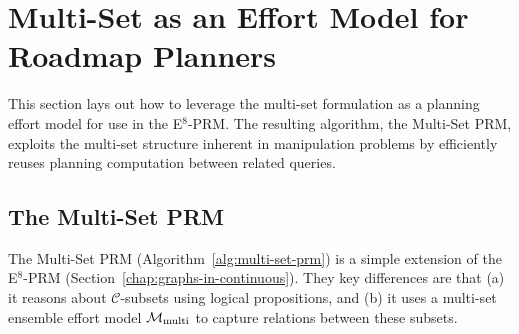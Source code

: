 %
%
%
%
%
%
%
%
%
%
%
%


\clearpage
\section{Multi-Set as an Effort Model for Roadmap Planners}
\label{chap:multi-set-prm}

This section lays out how to leverage the multi-set formulation
as a planning effort model
for use in the E$^8$-PRM.
The resulting algorithm,
the Multi-Set PRM,
exploits the multi-set structure inherent in manipulation problems
by efficiently reuses planning computation between related queries.

\subsection{The Multi-Set PRM}

The Multi-Set PRM (Algorithm~\ref{alg:multi-set-prm}) is a simple
extension of the \mbox{E$^8$-PRM}
(Section~\ref{chap:graphs-in-continuous}).
They key differences are that
(a) it reasons about $\mathcal{C}$-subsets
using logical propositions,
and (b) it uses a multi-set ensemble effort model
$\mathcal{M}_{\mbox{\scriptsize multi}}$ to capture relations
between these subsets.

